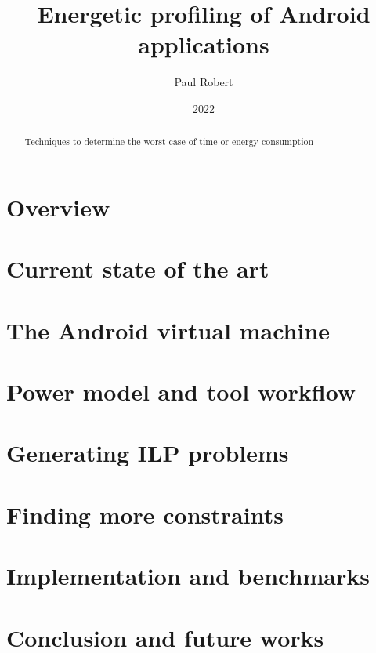\documentclass{article}
\title{Energetic profiling of Android applications}
\author{Paul Robert}
\date{2022}
\begin{document}
\maketitle

\begin{abstract}
    Techniques to determine the worst case of time or energy consumption
\end{abstract}
    
\section*{Overview}
\section*{Current state of the art}
\section*{The Android virtual machine}
\section*{Power model and tool workflow}
\section*{Generating ILP problems}
\section*{Finding more constraints}
\section*{Implementation and benchmarks}
\section*{Conclusion and future works}


\nocite{*}

\end{document}
